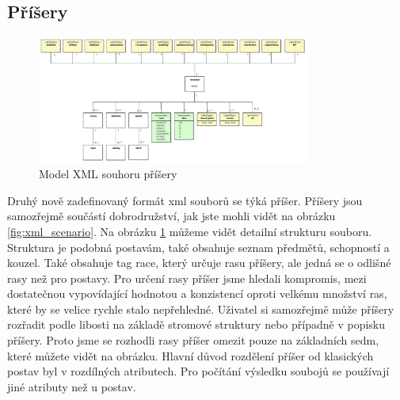 \documentclass[thesis=B,czech]{resources/FITthesis}[2012/06/26]
\begin{document}
\subsection{Příšery}
\begin{figure}\centering
	\includegraphics[width=0.8\textwidth]{images/monsterXML}
	\caption[Model XML souhoru příšery]{Model XML souhoru příšery}\label{fig:xml_monster}
\end{figure}
Druhý nově zadefinovaný formát xml souborů se týká příšer. Příšery jsou samozřejmě součástí dobrodružství, jak jste mohli vidět na obrázku \ref{fig:xml_scenario}. Na obrázku \ref{fig:xml_monster} můžeme vidět detailní strukturu souboru. Struktura je podobná postavám, také obsahuje seznam předmětů, schopností a kouzel. Také obsahuje tag race, který určuje rasu příšery, ale jedná se o odlišné rasy než pro postavy. Pro určení rasy příšer jsme hledali kompromis, mezi dostatečnou vypovídající hodnotou a konzistencí oproti velkému množství ras, které by se velice rychle stalo nepřehledné. Uživatel si samozřejmě může příšery rozřadit podle libosti na základě stromové struktury nebo případně v popisku příšery. Proto jsme se rozhodli rasy příšer omezit pouze na základních sedm, které můžete vidět na obrázku. Hlavní důvod rozdělení příšer od klasických postav byl v rozdílných atributech. Pro počítání výsledku soubojů se používají jiné atributy než u postav. 
\end{document}
